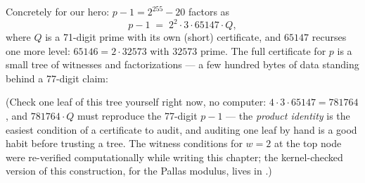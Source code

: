 Concretely for our hero: $p - 1 = 2^{255} - 20$ factors as
\[
p - 1 \;=\; 2^{2} \cdot 3 \cdot 65147 \cdot Q,
\]
where $Q$ is a 71-digit prime with its own (short) certificate, and
$65147$ recurses one more level: $65146 = 2 \cdot 32573$ with $32573$
prime. The full certificate for $p$ is a small tree of witnesses and
factorizations --- a few hundred bytes of data standing behind a 77-digit
claim:

\begin{center}
\end{center}

(Check one leaf of this tree yourself right now, no computer:
$4 \cdot 3 \cdot 65147 = 781764$, and $781764 \cdot Q$ must reproduce the
77-digit $p-1$ --- the \emph{product identity} is the easiest condition of
a certificate to audit, and auditing one leaf by hand is a good habit
before trusting a tree. The witness conditions for $w = 2$ at the top node
were re-verified computationally while writing this chapter; the
kernel-checked version of this construction, for the Pallas modulus, lives
in .)

